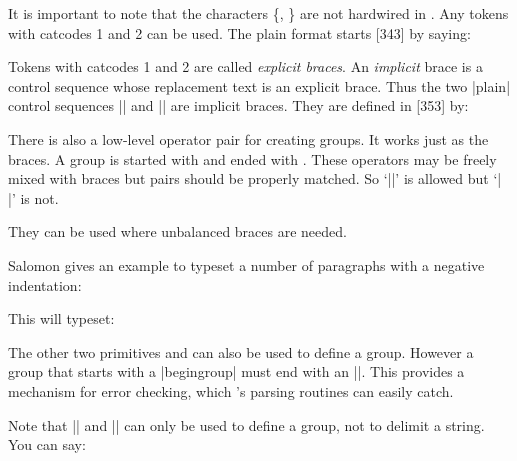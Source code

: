 It is important to note that the characters \{, \} are not hardwired in \tex. Any tokens with catcodes 1 and 2 can be used.
The plain format starts [343] by saying:

\begin{teX}

\catcode`\{ =1
\catcode `} = 2
\end{teX}

Tokens with catcodes 1 and 2 are called \emph{explicit braces}. An \emph{implicit} brace is a control sequence whose replacement text is an explicit brace. Thus the two |plain| control sequences 
|\bgroup| and |\egroup| are implicit braces. They are defined in [353] by:

There is also a low-level \tex operator pair for creating groups. It works
just as the braces. A group is started with  and ended with
. These operators may be freely mixed with braces but pairs
should be properly matched. So ‘|{ \begingroup \endgroup }|’ is allowed
but ‘|{ \begingroup } \endgroup|’ is not.


They can be used where unbalanced braces are needed.

Salomon gives an example to typeset a number of paragraphs with a negative indentation:

\begin{teX}
\def\negIndent{\bgoup\parindent=-20pt}
\def\endIndent{\par\egroup}

\negIndent
  \small\lipsum[1-3]
\endIndent
\end{teX}

This will typeset:

\def\negIndent{\bgroup\parindent=-20pt}
\def\endIndent{\par\egroup}

\negIndent
  \small\lipsum[1-3]
\endIndent


The other two primitives  and  can also be used to define a group. However a group that starts with a |begingroup| must end with an |\endgroup|. This provides a mechanism for error checking, which \tex's parsing routines can easily catch.

Note that |\begingroup| and |\endgroup| can only be used to define a group, not to delimit a string. You can say:

